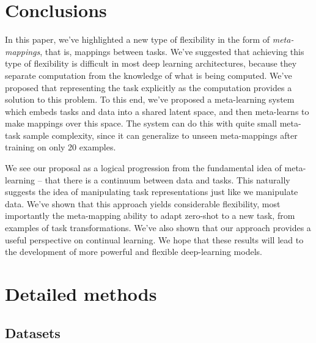 \documentclass{article}
\begin{document}
\section{Conclusions}
In this paper, we've highlighted a new type of flexibility in the form of \emph{meta-mappings}, that is, mappings between tasks. We've suggested that achieving this type of flexibility is difficult in most deep learning architectures, because they separate computation from the knowledge of what is being computed. We've proposed that representing the task explicitly as the computation provides a solution to this problem. To this end, we've proposed a meta-learning system which embeds tasks and data into a shared latent space, and then meta-learns to make mappings over this space. The system can do this with quite small meta-task sample complexity, since it can generalize to unseen meta-mappings after training on only 20 examples.\par
We see our proposal as a logical progression from the fundamental idea of meta-learning -- that there is a continuum between data and tasks. This naturally suggests the idea of manipulating task representations just like we manipulate data. We've shown that this approach yields considerable flexibility, most importantly the meta-mapping ability to adapt zero-shot to a new task, from examples of task transformations. We've also shown that our approach provides a useful perspective on continual learning. We hope that these results will lead to the development of more powerful and flexible deep-learning models. \par




\newpage
\appendix

\section{Detailed methods}
\subsection{Datasets}
\end{document}
